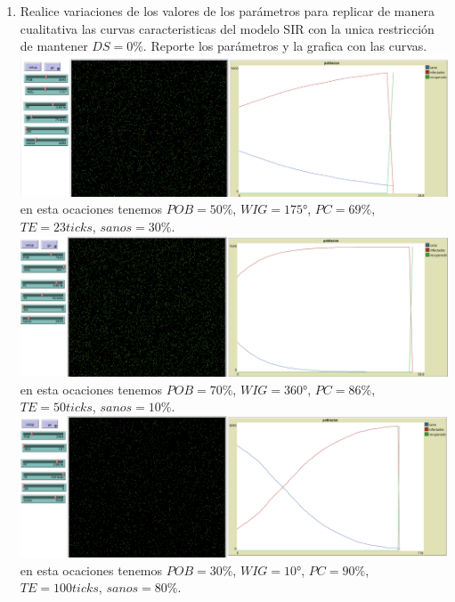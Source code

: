 \documentclass[12pt]{article}
\begin{document}
\begin{enumerate}
    \item Realice variaciones de los valores de los parámetros para replicar de manera cualitativa las curvas caracteristicas del modelo SIR con la unica restricción de mantener $DS=0\%$.
    Reporte los parámetros y la grafica con las curvas.\\

    \textbf{\includegraphics[scale = 0.30]{images/2-0.png}}\\
    en esta ocaciones tenemos $POB=50\%$, $WIG=175$°, $PC=69\%$, $TE=23ticks$, $sanos=30\%$.\\

    \textbf{\includegraphics[scale = 0.30]{images/2-1.png}}\\
    en esta ocaciones tenemos $POB=70\%$, $WIG=360$°, $PC=86\%$, $TE=50ticks$, $sanos=10\%$.\\

    \textbf{\includegraphics[scale = 0.30]{images/2-2.png}}\\
    en esta ocaciones tenemos $POB=30\%$, $WIG=10$°, $PC=90\%$, $TE=100ticks$, $sanos=80\%$.\\
    
    
    

\end{enumerate}
\end{document}
